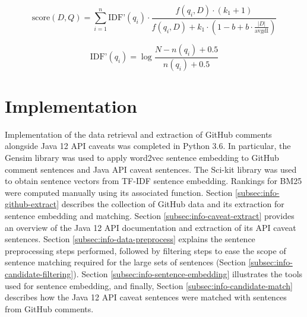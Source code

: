 \begin{equation} \label{eq:bm25} 
\text{score}(D,Q) = \sum_{i=1}^{n} \text{IDF'}(q_i) \cdot \frac{f(q_i, D) \cdot (k_1 + 1)}{f(q_i, D) + k_1 \cdot (1 - b + b \cdot \frac{|D|}{\text{avgdl}})} 
\end{equation}

\begin{equation} \label{eq:bm25-idf} 
\text{IDF'}(q_i) = \log{\frac{N - n(q_i) + 0.5}{n(q_i) + 0.5}}
\end{equation}

\section{Implementation}
\label{sec:info-implement}
Implementation of the data retrieval and extraction of GitHub comments alongside Java 12 API caveats was completed in Python 3.6. In particular, the Gensim library was used to apply word2vec sentence embedding to GitHub comment sentences and Java API caveat sentences. The Sci-kit library was used to obtain sentence vectors from TF-IDF sentence embedding. Rankings for BM25 were computed manually using its associated function. Section \ref{subsec:info-github-extract} describes the collection of GitHub data and its extraction for sentence embedding and matching. Section \ref{subsec:info-caveat-extract} provides an overview of the Java 12 API documentation and extraction of its API caveat sentences. Section \ref{subsec:info-data-preprocess} explains the sentence preprocessing steps performed, followed by filtering steps to ease the scope of sentence matching required for the large sets of sentences (Section \ref{subsec:info-candidate-filtering}). Section \ref{subsec:info-sentence-embedding} illustrates the tools used for sentence embedding, and finally, Section \ref{subsec:info-candidate-match} describes how the Java 12 API caveat sentences were matched with sentences from GitHub comments.

